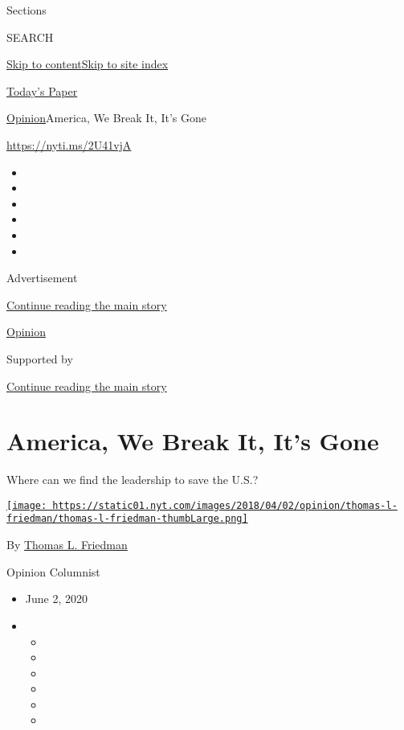 Sections

SEARCH

\protect\hyperlink{site-content}{Skip to
content}\protect\hyperlink{site-index}{Skip to site index}

\href{https://myaccount.nytimes.com/auth/login?response_type=cookie\&client_id=vi}{}

\href{https://www.nytimes.com/section/todayspaper}{Today's Paper}

\href{/section/opinion}{Opinion}\textbar{}America, We Break It, It's
Gone

\href{https://nyti.ms/2U41vjA}{https://nyti.ms/2U41vjA}

\begin{itemize}
\item
\item
\item
\item
\item
\item
\end{itemize}

Advertisement

\protect\hyperlink{after-top}{Continue reading the main story}

\href{/section/opinion}{Opinion}

Supported by

\protect\hyperlink{after-sponsor}{Continue reading the main story}

\hypertarget{america-we-break-it-its-gone}{%
\section{America, We Break It, It's
Gone}\label{america-we-break-it-its-gone}}

Where can we find the leadership to save the U.S.?

\href{https://www.nytimes.com/by/thomas-l-friedman}{\texttt{[image: https://static01.nyt.com/images/2018/04/02/opinion/thomas-l-friedman/thomas-l-friedman-thumbLarge.png]}}

By \href{https://www.nytimes.com/by/thomas-l-friedman}{Thomas L.
Friedman}

Opinion Columnist

\begin{itemize}
\item
  June 2, 2020
\item
  \begin{itemize}
  \item
  \item
  \item
  \item
  \item
  \item
  \end{itemize}
\end{itemize}


